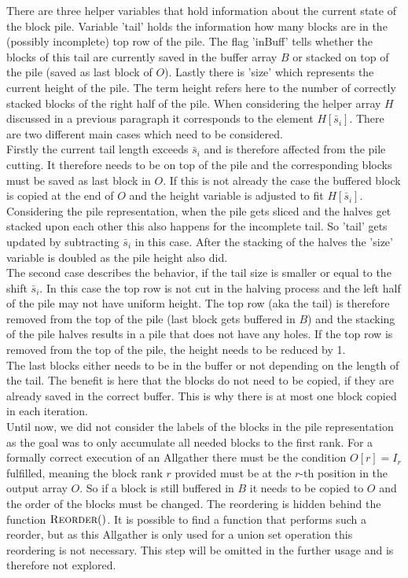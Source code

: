 There are three helper variables that hold information about the current state of the block pile. Variable 'tail' holds the information how many blocks are in the (possibly incomplete) top row of the pile. The flag 'inBuff' tells whether the blocks of this tail are currently saved in the buffer array $B$ or stacked on top of the pile (saved as last block of $O$). Lastly there is 'size' which represents the current height of the pile. The term height refers here to the number of correctly stacked blocks of the right half of the pile. When considering the helper array $H$ discussed in a previous paragraph it corresponds to the element $H[\bar{s}_i]$. There are two different main cases which need to be considered. \\
Firstly the current tail length exceeds $\bar{s}_i$ and is therefore affected from the pile cutting. It therefore needs to be on top of the pile and the corresponding blocks must be saved as last block in $O$. If this is not already the case the buffered block is  copied at the end of $O$ and the height variable is adjusted to fit $H[\bar{s}_i]$. Considering the pile representation, when the pile gets sliced and the halves get stacked upon each other this also happens for the incomplete tail. So 'tail' gets updated by subtracting $\bar{s}_i$ in this case. After the stacking of the halves the 'size' variable is doubled as the pile height also did.\\
The second case describes the behavior, if the tail size is smaller or equal to the shift $\bar{s}_i$. In this case the top row is not cut in the halving process and the left half of the pile may not have uniform height. The top row (aka the tail) is therefore removed from the top of the pile (last block gets buffered in $B$) and the stacking of the pile halves results in a pile that does not have any holes. If the top row is removed from the top of the pile, the height needs to be reduced by 1.\\
The last blocks either needs to be in the buffer or not depending on the length of the tail. The benefit is here that the blocks do not need to be copied, if they are already saved in the correct buffer. This is why there is at most one block copied in each iteration.\\
Until now, we did not consider the labels of the blocks in the pile representation as the goal was to only accumulate all needed blocks to the first rank.  For a formally correct execution of an Allgather there must be the condition $O[r]=I_r$ fulfilled, meaning the block rank $r$ provided must be at the $r$-th position in the output array $O$. So if a block is still buffered in $B$ it needs to be copied to $O$ and the order of the blocks must be changed. The reordering is hidden behind the function $\Call{Reorder}{ }$. It is possible to find a function that performs such a reorder, but as this Allgather is only used for a union set operation this reordering is not necessary. This step will be omitted in the further usage and is therefore not explored.

